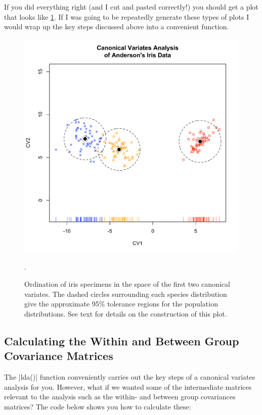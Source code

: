 If you did everything right (and I cut and pasted correctly!) you should get a plot that looks like \cref{fig:cva}.  If I was going to be repeatedly generate these types of plots I would wrap up the key steps discussed above into a convenient function.


\begin{figure}
\begin{center}
\includegraphics[height=0.5\columnwidth]{./figures/hands-on7/iris-cva-fancy}
\end{center}
\caption{Ordination of iris specimens in the space of the first two canonical variates.  The dashed circles surrounding each species distribution give the approximate 95\% tolerance regions for the population distributions. See text for details on the construction of this plot.} \label{fig:cva}.
\end{figure}

\subsection{Calculating the Within and Between Group Covariance Matrices}

The |lda()| function conveniently carries out the key steps of a canonical variates analysis for you.  However, what if we wanted some of the intermediate matrices relevant to the analysis such as the within- and between group covariances matrices? The code below shows you how to calculate these:



